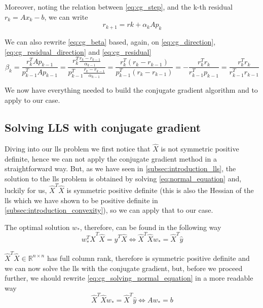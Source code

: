 \noindent Moreover, noting the relation between \eqref{eq:cg_step}, and the k-th residual $r_k=Ax_k-b$, we can write
\begin{equation}
    r_{k+1} = rk+\alpha_kAp_k
    \label{eq:cg_residual}
\end{equation}

\noindent We can also rewrite \eqref{eq:cg_beta} based, again, on \eqref{eq:cg_direction}, \eqref{eq:cg_residual_direction} and \eqref{eq:cg_residual}
\begin{equation}
    \beta_k = \frac{r^T_kAp_{k-1}}{p^T_{k-1}Ap_{k-1}} = \frac{r^T_k\frac{r_k-r_{k-1}}{\alpha_{k-1}}}{p^T_{k-1}\frac{r_k-r_{k-1}}{\alpha_{k-1}}} = \frac{r^T_k(r_k-r_{k-1})}{p^T_{k-1}(r_k-r_{k-1})} = -\frac{r^T_kr_k}{r^T_{k-1}p_{k-1}} = \frac{r^T_kr_k}{r^T_{k-1}r_{k-1}}
    \label{eq:cg_beta_efficient}
\end{equation}

\noindent We now have everything needed to build the conjugate gradient algorithm and to apply to our case.

\subsection{Solving LLS with conjugate gradient}\label{subsec:solve_LLS_cg}
Diving into our lls problem we first notice that $\hat{X}$ is not symmetric positive definite, hence we can not apply the conjugate gradient method in a straightforward way. But, as we have seen in \ref{subsec:introduction_lls}, the solution to the lls problem is obtained by solving \eqref{eq:normal_equation} and, luckily for us, $\hat{X}^T\hat{X}$ is symmetric positive definite (this is also the Hessian of the lls which we have shown to be positive definite in \ref{subsec:introduction_convexity}), so we can apply that to our case.
\vspace{3mm}

\noindent The optimal solution $w_*$, therefore, can be found in the following way
\begin{equation}
    w^T_*\hat{X}^T\hat{X}=\hat{y}^T\hat{X} \Longleftrightarrow \hat{X}^T\hat{X}w_*=\hat{X}^T\hat{y}
    \label{eq:cg_solving_normal_equation}
\end{equation}

\noindent $\hat{X}^T\hat{X} \in \mathbb{R}^{n \times n}$ has full column rank, therefore is symmetric positive definite and we can now solve the lls with the conjugate gradient, but, before we proceed further, we should rewrite \eqref{eq:cg_solving_normal_equation} in a more readable way
\begin{equation}
    \hat{X}^T\hat{X}w_*=\hat{X}^T\hat{y} \Longleftrightarrow Aw_*=b
    \label{eq:cg_normal_equation_rewritten}
\end{equation}

